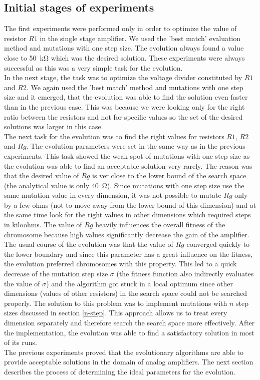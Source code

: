 \subsection{Initial stages of experiments}
The first experiments were performed only in order to optimize the value of resistor $R1$ in the single stage amplifier. We used the 'best match' evaluation method and mutations with one step size. The evolution always found a value close to \SI{50}{\kilo\ohm} which was the desired solution. These experiments were always successful as this was a very simple task for the evolution.\\
In the next stage, the task was to optimize the voltage divider constituted by $R1$ and $R2$. We again used the 'best match' method and mutations with one step size and it emerged, that the evolution was able to find the solution even faster than in the previous case. This was because we were looking only for the right ratio between the resistors and not for specific values so the set of the desired solutions was larger in this case.\\
The next task for the evolution was to find the right values for resistors $R1$, $R2$ and $Rg$. The evolution parameters were set in the same way as in the previous experiments. This task showed the weak spot of mutations with one step size as the evolution was able to find an acceptable solution very rarely. The reason was that the desired value of $Rg$ is ver close to the lower bound of the search space (the analytical value is only \SI{40}{\ohm}). Since mutations with one step size use the same mutation value in every dimension, it was not possible to mutate $Rg$ only by a few ohms (not to move away from the lower bound of this dimension) and at the same time look for the right values in other dimensions which required steps in kiloohms. The value of $Rg$ heavily influences the overall fitness of the chromosome because high values significantly decrease the gain of the amplifier. The usual course of the evolution was that the value of $Rg$ converged quickly to the lower boundary and since this parameter has a great influence on the fitness, the evolution preferred chromosomes with this property. This led to a quick decrease of the mutation step size $\sigma$ (the fitness function also indirectly evaluates the value of $\sigma$) and the algorithm got stuck in a local optimum since other dimensions (values of other resistors) in the search space could not be searched properly. The solution to this problem was to implement mutations with $n$ step sizes discussed in section \ref{n-step}. This approach allows us to treat every dimension separately and therefore search the search space more effectively. After the implementation, the evolution was able to find a satisfactory solution in most of its runs.\\
The previous experiments proved that the evolutionary algorithms are able to provide acceptable solutions in the domain of analog amplifiers. The next section describes the process of determining the ideal parameters for the evolution.

